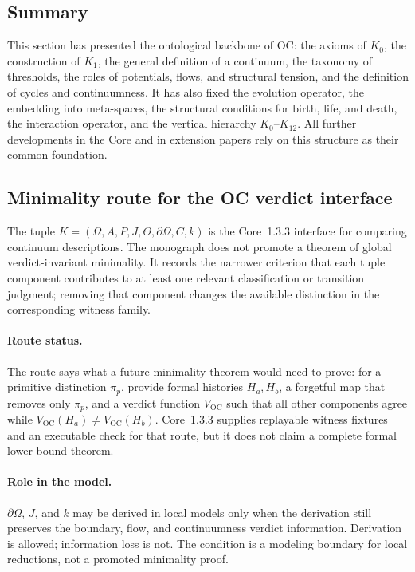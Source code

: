 \subsection{Summary}

This section has presented the ontological backbone of OC:
the axioms of \(K_0\), the construction of \(K_1\), the general definition of a continuum,
the taxonomy of thresholds, the roles of potentials, flows, and structural tension,
and the definition of cycles and continuumness.
It has also fixed the evolution operator, the embedding into meta-spaces, the
structural conditions for birth, life, and death, the interaction operator, and
the vertical hierarchy \(K_0\)–\(K_{12}\).
All further developments in the Core and in extension papers rely on this structure as their common foundation.


\subsection{Minimality route for the OC verdict interface}
\label{sec:oc13-global-verdict-minimality}

The tuple \(K=(\Omega,A,P,J,\Theta,\partial\Omega,C,k)\) is the Core~1.3.3
interface for comparing continuum descriptions. The monograph does not promote
a theorem of global verdict-invariant minimality. It records the narrower
criterion that each tuple component contributes to at least one relevant
classification or transition judgment; removing that component changes the
available distinction in the corresponding witness family.

\paragraph{Route status.}
The route says what a future minimality theorem would need to prove: for a
primitive distinction \(\pi_p\), provide formal histories \(H_a,H_b\), a
forgetful map that removes only \(\pi_p\), and a verdict function
\(V_{\mathrm{OC}}\) such that all other components agree while
\(V_{\mathrm{OC}}(H_a)\neq V_{\mathrm{OC}}(H_b)\).  Core~1.3.3 supplies
replayable witness fixtures and an executable check for that
route, but it does not claim a complete formal lower-bound theorem.

\paragraph{Role in the model.}
\(\partial\Omega\), \(J\), and \(k\) may be derived in local models only when
the derivation still preserves the boundary, flow, and continuumness verdict
information. Derivation is allowed; information loss is not. The condition is a
modeling boundary for local reductions, not a promoted minimality proof.

